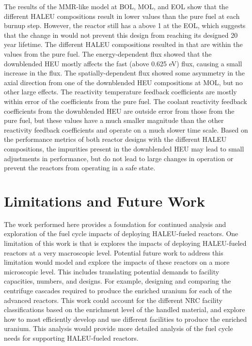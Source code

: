 The results of the \gls{MMR}-like model at \gls{BOL}, \gls{MOL}, 
and \gls{EOL} show that the different \gls{HALEU} compositions 
result in lower \keff values than the pure fuel at each burnup 
step. However, 
the reactor still has a \keff above 1 at the \gls{EOL}, 
which suggests that the change in \keff would not prevent this 
design from reaching its designed 20 year lifetime. The 
different \gls{HALEU} compositions resulted in \betaEff that 
are within the values from the pure fuel. The energy-dependent 
flux showed that the downblended \gls{HEU} mostly affects 
the fast (above 0.625 eV) flux, causing a small increase in 
the flux. The spatially-dependent flux showed some 
asymmetry in the axial direction from one of the downblended 
\gls{HEU} compositions at \gls{MOL}, but no other large 
effects. The reactivity temperature feedback coefficients 
are mostly within error of the coefficients from the pure fuel. 
The coolant reactivity feedback coefficients from the downblended 
\gls{HEU} are outside error from those from the pure fuel, 
but these values have a much smaller magnitude than the other 
reactivity feedback coefficients and operate on a much 
slower time scale. Based on the performance metrics of 
both reactor designs with the different \gls{HALEU} 
compositions, the impurities present in the downblended 
\gls{HEU} may lead to small adjustments in performance, but do 
not lead to large changes in operation or prevent the 
reactors from operating in a safe state. 
 
\section{Limitations and Future Work}
The work performed here provides a foundation for continued analysis and 
exploration of the fuel cycle impacts of deploying \gls{HALEU}-fueled reactors. 
One limitation of this work is that is explores the impacts of 
deploying \gls{HALEU}-fueled reactors at a very macroscopic level. 
Potential future work to address this limitation would model and 
explore the impacts of these reactors on a more microscopic level. 
This includes translating potential demands to facility capacities, 
numbers, and designs. For example, designing and comparing the 
centrifuge cascades required to produce the enriched uranium for 
each of the advanced reactors. This work could account for the 
different \gls{NRC} facility classifications based on the 
enrichment level of the handled material, and explore how to 
most efficiently develop and use different facilities to produce the 
enriched uranium. This analysis would provide more detailed analysis 
of the fuel cycle needs for supporting \gls{HALEU}-fueled reactors. 

